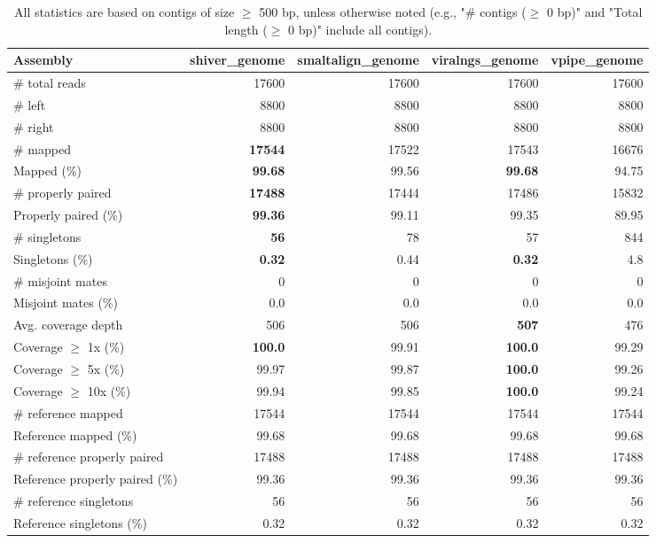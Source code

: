 \documentclass[12pt,a4paper]{article}
\begin{document}
\begin{table}[ht]
\begin{center}
\caption{All statistics are based on contigs of size $\geq$ 500 bp, unless otherwise noted (e.g., "\# contigs ($\geq$ 0 bp)" and "Total length ($\geq$ 0 bp)" include all contigs).}
\begin{tabular}{|l*{4}{|r}|}
\hline
Assembly & shiver\_genome & smaltalign\_genome & viralngs\_genome & vpipe\_genome \\ \hline
\# total reads & 17600 & 17600 & 17600 & 17600 \\ \hline
\# left & 8800 & 8800 & 8800 & 8800 \\ \hline
\# right & 8800 & 8800 & 8800 & 8800 \\ \hline
\# mapped & {\bf 17544} & 17522 & 17543 & 16676 \\ \hline
Mapped (\%) & {\bf 99.68} & 99.56 & {\bf 99.68} & 94.75 \\ \hline
\# properly paired & {\bf 17488} & 17444 & 17486 & 15832 \\ \hline
Properly paired (\%) & {\bf 99.36} & 99.11 & 99.35 & 89.95 \\ \hline
\# singletons & {\bf 56} & 78 & 57 & 844 \\ \hline
Singletons (\%) & {\bf 0.32} & 0.44 & {\bf 0.32} & 4.8 \\ \hline
\# misjoint mates & 0 & 0 & 0 & 0 \\ \hline
Misjoint mates (\%) & 0.0 & 0.0 & 0.0 & 0.0 \\ \hline
Avg. coverage depth & 506 & 506 & {\bf 507} & 476 \\ \hline
Coverage $\geq$ 1x (\%) & {\bf 100.0} & 99.91 & {\bf 100.0} & 99.29 \\ \hline
Coverage $\geq$ 5x (\%) & 99.97 & 99.87 & {\bf 100.0} & 99.26 \\ \hline
Coverage $\geq$ 10x (\%) & 99.94 & 99.85 & {\bf 100.0} & 99.24 \\ \hline
\# reference mapped & 17544 & 17544 & 17544 & 17544 \\ \hline
Reference mapped (\%) & 99.68 & 99.68 & 99.68 & 99.68 \\ \hline
\# reference properly paired & 17488 & 17488 & 17488 & 17488 \\ \hline
Reference properly paired (\%) & 99.36 & 99.36 & 99.36 & 99.36 \\ \hline
\# reference singletons & 56 & 56 & 56 & 56 \\ \hline
Reference singletons (\%) & 0.32 & 0.32 & 0.32 & 0.32 \\ \hline

\end{tabular}
\end{center}
\end{table}
\end{document}
